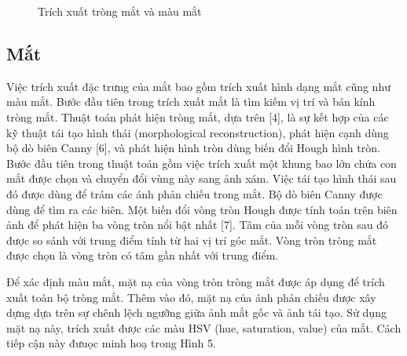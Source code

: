\documentclass[journal]{IEEEtran}
\begin{document}
\begin{figure}[!t]
\caption{Trích xuất tròng mắt và màu mắt}
\label{refhinh5}
\end{figure}

\subsection{Mắt}

Việc trích xuất đặc trưng của mắt bao gồm trích xuất hình dạng mắt cũng như màu mắt. Bước đầu tiên trong trích xuất mắt là tìm kiếm vị trí và bán kính tròng mắt. Thuật toán phát hiện tròng mắt, dựa trên [4], là sự kết hợp của các kỹ thuật tái tạo hình thái (morphological reconstruction), phát hiện cạnh dùng bộ dò biên Canny [6], và phát hiện hình tròn dùng biến đổi Hough hình tròn. Bước đầu tiên trong thuật toán gồm việc trích xuất một khung bao lớn chứa con mắt được chọn và chuyển đổi vùng này sang ảnh xám. Việc tái tạo hình thái sau đó được dùng để trám các ánh phản chiếu trong mắt. Bộ dò biên Canny được dùng để tìm ra các biên. Một biến đổi vòng tròn Hough được tính toán trên biên ảnh để phát hiện ba vòng tròn nổi bật nhất [7]. Tâm của mỗi vòng tròn sau đó được so sánh với trung điểm tính từ hai vị trí góc mắt. Vòng tròn tròng mắt được chọn là vòng tròn có tâm gần nhất với trung điểm.

Để xác định màu mắt, mặt nạ của vòng tròn tròng mắt được áp dụng để trích xuất toàn bộ tròng mắt. Thêm vào đó, mặt nạ của ánh phản chiếu được xây dựng dựa trên sự chênh lệch ngưỡng giữa ảnh mắt gốc và ảnh tái tạo. Sử dụng mặt nạ này, trích xuất được các màu HSV (hue, saturation, value) của mắt. Cách tiếp cận này đưuọc minh hoạ trong Hình 5.
\end{document}
